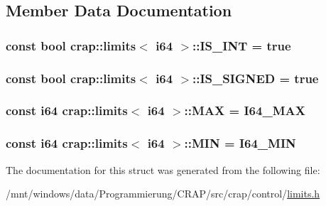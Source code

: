 \subsection{Member Data Documentation}
\hypertarget{structcrap_1_1limits_3_01i64_01_4_a1c75e13842bd5be8dc607703aa3bde20}{
\subsubsection[{I\-S\-\_\-\-I\-N\-T}]{\setlength{\rightskip}{0pt plus 5cm}const bool {\bf crap\-::limits}$<$ {\bf i64} $>$\-::I\-S\-\_\-\-I\-N\-T = true\hspace{0.3cm}{\ttfamily [static]}}}\label{structcrap_1_1limits_3_01i64_01_4_a1c75e13842bd5be8dc607703aa3bde20}
\hypertarget{structcrap_1_1limits_3_01i64_01_4_abc50902329af13ea9041e31b99530519}{
\subsubsection[{I\-S\-\_\-\-S\-I\-G\-N\-E\-D}]{\setlength{\rightskip}{0pt plus 5cm}const bool {\bf crap\-::limits}$<$ {\bf i64} $>$\-::I\-S\-\_\-\-S\-I\-G\-N\-E\-D = true\hspace{0.3cm}{\ttfamily [static]}}}\label{structcrap_1_1limits_3_01i64_01_4_abc50902329af13ea9041e31b99530519}
\hypertarget{structcrap_1_1limits_3_01i64_01_4_af68dda1c50195c3f58e4517fc21d69f4}{
\subsubsection[{M\-A\-X}]{\setlength{\rightskip}{0pt plus 5cm}const {\bf i64} {\bf crap\-::limits}$<$ {\bf i64} $>$\-::M\-A\-X = {\bf I64\-\_\-\-M\-A\-X}\hspace{0.3cm}{\ttfamily [static]}}}\label{structcrap_1_1limits_3_01i64_01_4_af68dda1c50195c3f58e4517fc21d69f4}
\hypertarget{structcrap_1_1limits_3_01i64_01_4_a50f4434a55e01e7dae98941d5595a6b3}{
\subsubsection[{M\-I\-N}]{\setlength{\rightskip}{0pt plus 5cm}const {\bf i64} {\bf crap\-::limits}$<$ {\bf i64} $>$\-::M\-I\-N = {\bf I64\-\_\-\-M\-I\-N}\hspace{0.3cm}{\ttfamily [static]}}}\label{structcrap_1_1limits_3_01i64_01_4_a50f4434a55e01e7dae98941d5595a6b3}


The documentation for this struct was generated from the following file\-:\begin{DoxyCompactItemize}
\item 
/mnt/windows/data/\-Programmierung/\-C\-R\-A\-P/src/crap/control/\hyperlink{limits_8h}{limits.\-h}\end{DoxyCompactItemize}
